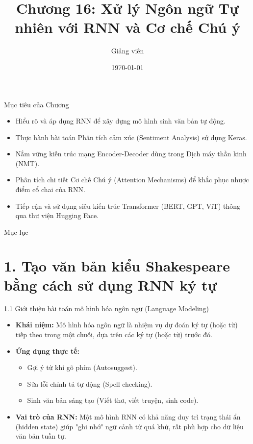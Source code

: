 \documentclass[aspectratio=169, 12pt]{beamer}
\title[ML - Chap 16]{Chương 16: Xử lý Ngôn ngữ Tự nhiên với RNN và Cơ chế Chú ý}
\author[Giảng viên]{Giảng viên}
\institute[Đại học Đông Á]{Đại học Đông Á}
\date{\today}
\begin{document}
\begin{frame}
    \titlepage
\end{frame}

\begin{frame}{Mục tiêu của Chương}
    \begin{itemize}
        \item Hiểu rõ và áp dụng RNN để xây dựng mô hình sinh văn bản tự động.
        \item Thực hành bài toán Phân tích cảm xúc (Sentiment Analysis) sử dụng Keras.
        \item Nắm vững kiến trúc mạng Encoder-Decoder dùng trong Dịch máy thần kinh (NMT).
        \item Phân tích chi tiết Cơ chế Chú ý (Attention Mechanisms) để khắc phục nhược điểm cổ chai của RNN.
        \item Tiếp cận và sử dụng siêu kiến trúc Transformer (BERT, GPT, ViT) thông qua thư viện Hugging Face.
    \end{itemize}
\end{frame}

\begin{frame}{Mục lục}
    \tableofcontents
\end{frame}

\section{1. Tạo văn bản kiểu Shakespeare bằng cách sử dụng RNN ký tự}

\begin{frame}{1.1 Giới thiệu bài toán mô hình hóa ngôn ngữ (Language Modeling)}
    \begin{itemize}
        \item \textbf{Khái niệm:} Mô hình hóa ngôn ngữ là nhiệm vụ dự đoán ký tự (hoặc từ) tiếp theo trong một chuỗi, dựa trên các ký tự (hoặc từ) trước đó.
        \item \textbf{Ứng dụng thực tế:}
            \begin{itemize}
                \item Gợi ý từ khi gõ phím (Autosuggest).
                \item Sửa lỗi chính tả tự động (Spell checking).
                \item Sinh văn bản sáng tạo (Viết thơ, viết truyện, sinh code).
            \end{itemize}
        \item \textbf{Vai trò của RNN:} Một mô hình RNN có khả năng duy trì trạng thái ẩn (hidden state) giúp "ghi nhớ" ngữ cảnh từ quá khứ, rất phù hợp cho dữ liệu văn bản tuần tự.
    \end{itemize}
\end{frame}
\end{document}
